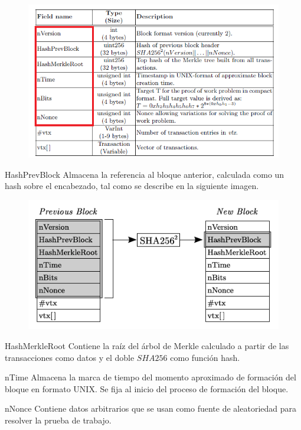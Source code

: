 \documentclass{beamer}
\theoremstyle{definition}
\begin{document}
\begin{frame}
	
	\begin{figure}
		\includegraphics[scale=0.5]{bloque}
	\end{figure}
\end{frame}

\begin{frame}
\begin{block}{HashPrevBlock}
	Almacena la referencia al bloque anterior, calculada como un hash sobre el encabezado, tal como se describe en la siguiente imagen.
	\begin{figure}[h!]
		\includegraphics[scale=0.5]{referencia}
	\end{figure}
\end{block}
\end{frame}



\begin{frame}
	\begin{block}{HashMerkleRoot}
		Contiene la raíz del árbol de Merkle calculado a partir de las transacciones como datos y el doble $SHA256$ como función hash. 
	\end{block}\pause
\begin{block}{nTime}
	Almacena la marca de tiempo del momento aproximado de formación del bloque en formato UNIX. Se fija al inicio del proceso de formación del bloque.
\end{block}\pause
\begin{block}{nNonce}
	Contiene datos arbitrarios que se usan como fuente de aleatoriedad para resolver la prueba de trabajo.
\end{block}
\end{frame}
\end{document}
